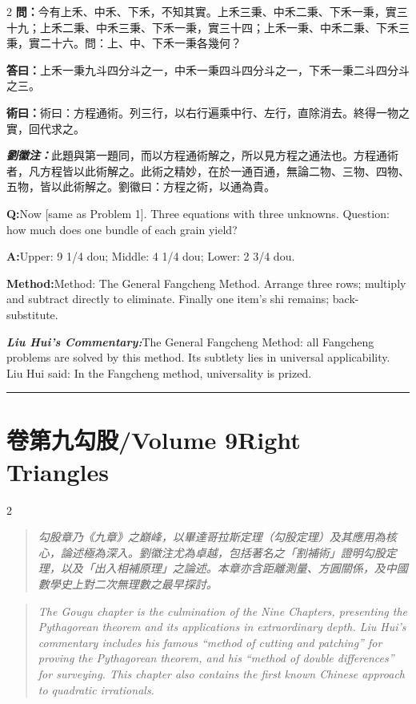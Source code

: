 \documentclass[11pt,a4paper]{article}
\newcommand{\cnwen}{\textcolor{cnlabelfg}{\textbf{問：}}}
\newcommand{\cnda}{\textbf{答曰：}}
\newcommand{\cnshu}{\textcolor{cnlabelfg}{\textbf{術曰：}}}
\newcommand{\cnzhu}{\textcolor{commentarycolor}{\textit{\textbf{劉徽注：}}}}
\newcommand{\enwen}{\textcolor{enlabelfg}{\textbf{Q:}}}
\newcommand{\enda}{\textcolor{enlabelfg}{\textbf{A:}}}
\newcommand{\enshu}{\textcolor{enlabelfg}{\textbf{Method:}}}
\newcommand{\enzhu}{\textcolor{enlabelfg}{\textit{\textbf{Liu Hui's Commentary:}}}}
\begin{document}
\begin{paracol}{2}
\switchcolumn[0]
\cnwen 今有上禾、中禾、下禾，不知其實。上禾三秉、中禾二秉、下禾一秉，實三十九；上禾二秉、中禾三秉、下禾一秉，實三十四；上禾一秉、中禾二秉、下禾三秉，實二十六。問：上、中、下禾一秉各幾何？

\cnda 上禾一秉九斗四分斗之一，中禾一秉四斗四分斗之一，下禾一秉二斗四分斗之三。

\cnshu 術曰：方程通術。列三行，以右行遍乘中行、左行，直除消去。終得一物之實，回代求之。

\cnzhu 此題與第一題同，而以方程通術解之，所以見方程之通法也。方程通術者，凡方程皆以此術解之。此術之精妙，在於一通百通，無論二物、三物、四物、五物，皆以此術解之。劉徽曰：方程之術，以通為貴。

\switchcolumn[1]
\enwen Now [same as Problem 1]. Three equations with three unknowns. Question: how much does one bundle of each grain yield?

\enda Upper: 9 1/4 dou; Middle: 4 1/4 dou; Lower: 2 3/4 dou.

\enshu Method: The General Fangcheng Method. Arrange three rows; multiply and subtract directly to eliminate. Finally one item's shi remains; back-substitute.

\enzhu The General Fangcheng Method: all Fangcheng problems are solved by this method. Its subtlety lies in universal applicability. Liu Hui said: In the Fangcheng method, universality is prized.
\end{paracol}

\bigskip\hrule\bigskip

\newpage
\section*{卷第九\quad 勾股\quad /\quad Volume 9\quad Right Triangles}

\begin{paracol}{2}
\switchcolumn[0]
\begin{quote}\color{quotecolor}\small
\textit{勾股章乃《九章》之巔峰，以畢達哥拉斯定理（勾股定理）及其應用為核心，論述極為深入。劉徽注尤為卓越，包括著名之「割補術」證明勾股定理，以及「出入相補原理」之論述。本章亦含距離測量、方圓關係，及中國數學史上對二次無理數之最早探討。}
\end{quote}
\switchcolumn[1]
\begin{quote}\color{quotecolor}\small
\textit{The Gougu chapter is the culmination of the Nine Chapters, presenting the Pythagorean theorem and its applications in extraordinary depth. Liu Hui's commentary includes his famous ``method of cutting and patching'' for proving the Pythagorean theorem, and his ``method of double differences'' for surveying. This chapter also contains the first known Chinese approach to quadratic irrationals.}
\end{quote}
\end{paracol}
\end{document}
